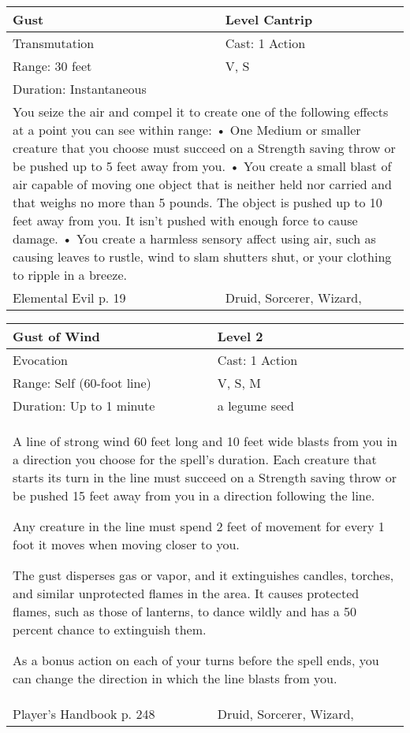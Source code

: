 \documentclass[11pt]{report}
\begin{document}
\begin{table}[H]
	\begin{tabular}{||p{6cm}|p{6cm}||}
		\hline\hline
		\bf{Gust} & Level Cantrip\\ \hline
		Transmutation & Cast: 1 Action\\ \hline
		Range: 30 feet & V, S\\ \hline
		Duration: Instantaneous & \\ \hline
		\multicolumn{2}{||p{12cm}||}{You seize the air and compel it to create one of the following effects at a point you can see within range:
• One Medium or smaller creature that you choose must succeed on a Strength saving throw or be pushed up to 5 feet away from you.
• You create a small blast of air capable of moving one object that is neither held nor carried and that weighs no more than 5 pounds. The object is pushed up to 10 feet away from you. It isn’t pushed with enough force to cause damage.
• You create a harmless sensory affect using air, such as causing leaves to rustle, wind to slam shutters shut, or your clothing to ripple in a breeze.}\\ \hline
Elemental Evil p. 19 & Druid, Sorcerer, Wizard, \\ \hline\hline
	\end{tabular}
\end{table}

\begin{table}[H]
	\begin{tabular}{||p{6cm}|p{6cm}||}
		\hline\hline
		\bf{Gust of Wind} & Level 2\\ \hline
		Evocation & Cast: 1 Action\\ \hline
		Range: Self (60-foot line) & V, S, M\\ \hline
		Duration: Up to 1 minute & a legume seed\\ \hline
		\multicolumn{2}{||p{12cm}||}{A line of strong wind 60 feet long and 10 feet wide blasts from you in a direction you choose for the spell’s duration. Each creature that starts its turn in the line must succeed on a Strength saving throw or be pushed 15 feet away from you in a direction following the line.

Any creature in the line must spend 2 feet of movement for every 1 foot it moves when moving closer to you.

The gust disperses gas or vapor, and it extinguishes candles, torches, and similar unprotected flames in the area. It causes protected flames, such as those of lanterns, to dance wildly and has a 50 percent chance to extinguish them.

As a bonus action on each of your turns before the spell ends, you can change the direction in which the line blasts from you.}\\ \hline
Player's Handbook p. 248 & Druid, Sorcerer, Wizard, \\ \hline\hline
	\end{tabular}
\end{table}
\end{document}
